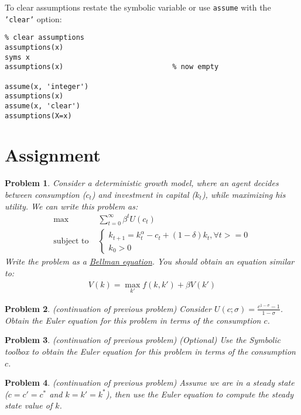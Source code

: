 \documentclass[12pt, a4paper]{article}
\newtheorem{problem}{Problem}
\begin{document}
To clear assumptions restate the symbolic variable or use \texttt{assume} with the \texttt{'clear'} option:
\lstset{language=matlab,label= ,caption= ,captionpos=b,firstnumber=1,numbers=left,style=Matlab-editor}
\begin{lstlisting}
% clear assumptions
assumptions(x)
syms x
assumptions(x)                          % now empty

assume(x, 'integer')
assumptions(x)
assume(x, 'clear')
assumptions(X=x)
\end{lstlisting}
\section{Assignment}
\label{sec:org6aa77ab}
\begin{problem}
Consider a deterministic growth model, where an agent decides between consumption (\(c_t\)) and investment in capital (\(k_t\)), while maximizing his utility.
We can write this problem as:
\begin{align*}
  \max&\sum_{t=0}^{\infty}\beta^tU(c_t)\\
  \text{subject to }&
                      \begin{cases}
                        k_{t+1} = k_t^{\alpha} - c_t + (1-\delta)k_t, \forall t >= 0\\
                        k_0 > 0
                      \end{cases}
\end{align*}
Write the problem as a \href{https://en.wikipedia.org/wiki/Bellman\_equation}{Bellman equation}.
You should obtain an equation similar to:
\begin{align*}
V(k) = \max_{k'}{f(k, k') + \beta V(k')}
\end{align*}
\end{problem}

\begin{problem}
(continuation of previous problem)
Consider \(U(c; \sigma)=\frac{c^{1-\sigma}-1}{1-\sigma}\).
Obtain the Euler equation for this problem in terms of the consumption \(c\).
\end{problem}

\begin{problem}
(continuation of previous problem) (Optional)
Use the Symbolic toolbox to obtain the Euler equation for this problem in terms of the consumption \(c\).
\end{problem}

\begin{problem}
(continuation of previous problem)
Assume we are in a steady state (\(c=c'=c^*\) and \(k=k'=k^*\)), then use the Euler equation to compute the steady state value of \(k\).
\end{problem}
\end{document}
